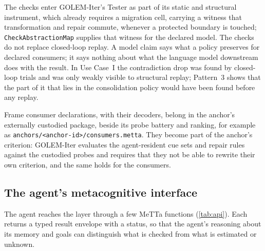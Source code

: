 \documentclass[11pt]{article}
\newcommand{\fpath}[1]{\nolinkurl{#1}}
\newcommand{\code}[1]{\texttt{#1}}
\theoremstyle{definition}
\theoremstyle{plain}
\begin{document}
The checks enter GOLEM-Iter's Tester as part of its static and structural instrument, which already
requires a migration cell, carrying a witness that transformation and repair commute, whenever a
protected boundary is touched; \code{CheckAbstractionMap} supplies that witness for the declared
model. The checks do not replace closed-loop replay. A model claim says what
a policy preserves for declared consumers; it says nothing about what the language model downstream
does with the result. In Use Case~I the contradiction drop was found by closed-loop trials and was
only weakly visible to structural replay; Pattern~3 shows that the part of it that lies in the
consolidation policy would have been found before any replay.

Frame consumer declarations, with their decoders, belong in the anchor's externally custodied
package, beside its probe battery and ranking, for example as
\fpath{anchors/<anchor-id>/consumers.metta}. They become part
of the anchor's criterion: GOLEM-Iter evaluates the agent-resident cue sets and repair rules
against the custodied probes and requires that they not be able to rewrite their own criterion, and
the same holds for the consumers.

\subsection{The agent's metacognitive interface}\label{sec:agentapi}

The agent reaches the layer through a few MeTTa functions (\cref{tab:api}). Each returns a typed
result envelope with a status, so that the agent's reasoning about its memory and goals can
distinguish what is checked from what is estimated or unknown.
\end{document}
